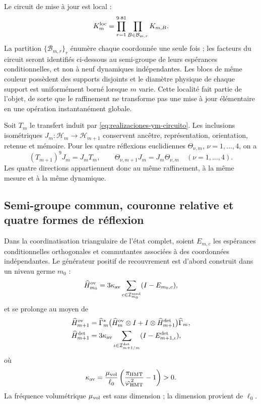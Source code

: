 Le circuit de mise à jour est local :
\begin{equation}\label{eq:realizaciones-ym-circuito}
 K_m^{\rm loc}
 =\prod_{r=1}^{9\cdot81}
   \prod_{B\in\mathcal B_{m,r}}K_{m,B}.
\end{equation}
La partition \(\{\mathcal B_{m,r}\}_r\) énumère chaque coordonnée une seule fois ; les facteurs
du circuit seront identifiés ci-dessous au semi-groupe de leurs espérances
conditionnelles, et non à neuf dynamiques indépendantes.
Les blocs de même couleur possèdent des supports disjoints et le diamètre physique
de chaque support est uniformément borné lorsque \(m\) varie. Cette localité
fait partie de l’objet, de sorte que le raffinement ne transforme pas une
mise à jour élémentaire en une opération instantanément globale.

Soit \(T_m\) le transfert induit par
\eqref{eq:realizaciones-ym-circuito}. Les inclusions isométriques
\(J_m:\mathcal H_m\to\mathcal H_{m+1}\) conservent ancêtre,
représentation, orientation, retenue et mémoire. Pour les quatre réflexions
euclidiennes \(\Theta_{\nu,m}\), \(\nu=1,\ldots,4\), on a
\begin{equation}\label{eq:realizaciones-ym-entrelazamiento}
 (T_{m+1})^9J_m=J_mT_m,
 \qquad
 \Theta_{\nu,m+1}J_m=J_m\Theta_{\nu,m}
 \quad(\nu=1,\ldots,4).
\end{equation}
Les quatre directions appartiennent donc au même raffinement, à la même mesure et à la même dynamique.

\subsection*{Semi-groupe commun, couronne relative et quatre formes de réflexion}

Dans la coordinatisation triangulaire de l'état complet, soient \(E_{m,c}\) les espérances conditionnelles orthogonales et commutantes associées à des coordonnées indépendantes. Le générateur positif de recouvrement est d'abord construit dans un niveau germe \(m_0\) :
\begin{equation}\label{eq:realizaciones-ym-generador}
 \widehat H_{m_0}^{\rm ov}
 =3\kappa_{\rm av}
  \sum_{c\in\mathcal I_{m_0}^{\rm seed}}(I-E_{m_0,c}),
\end{equation}
et se prolonge au moyen de
\begin{equation}\label{eq:realizaciones-ym-generador-refinado}
 \begin{aligned}
 \widehat H_{m+1}^{\rm ov}
 &=\widehat\Gamma_m^*
   \bigl(\widehat H_m^{\rm ov}\otimes I+
         I\otimes\widehat H_{m+1}^{\rm det}\bigr)
   \widehat\Gamma_m,\\
 \widehat H_{m+1}^{\rm det}
 &=3\kappa_{\rm av}
   \sum_{\iota\in\mathcal I_{m+1/m}^{\rm det}}
   (I-E_{m+1,\iota}^{\rm det}),
 \end{aligned}
\end{equation}
où
\begin{equation}\label{eq:realizaciones-ym-kappa}
 \kappa_{\rm av}
 =\frac{\mu_{\rm vol}}{\ell_0}
  \left(\frac{\pi_{\rm HMT}}{\varphi_{\rm HMT}^{\,2}}-1\right)>0.
\end{equation}
La fréquence volumétrique \(\mu_{\rm vol}\) est sans dimension ; la dimension provient de \(\ell_0\).

